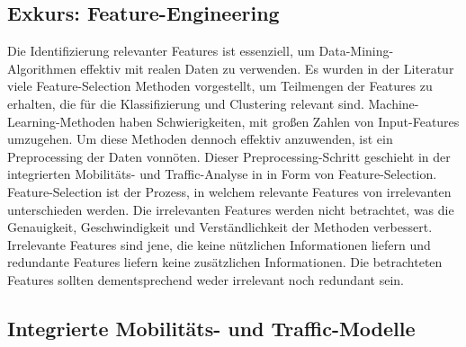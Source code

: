 \documentclass[12pt, a4paper]{article}
\begin{document}
\subsection{Exkurs: Feature-Engineering}
Die Identifizierung relevanter Features ist essenziell, um Data-Mining-Algorithmen effektiv mit realen Daten zu verwenden.
Es wurden in der Literatur viele Feature-Selection Methoden vorgestellt, um Teilmengen der Features zu erhalten,
die für die Klassifizierung und Clustering relevant sind.
Machine-Learning-Methoden haben Schwierigkeiten, mit großen Zahlen von Input-Features
umzugehen. Um diese Methoden dennoch effektiv anzuwenden, ist ein Preprocessing der Daten vonnöten. \cite{Kumar2014}
Dieser Preprocessing-Schritt geschieht in der integrierten Mobilitäts- und Traffic-Analyse in \cite{Alipour2018} in
Form von Feature-Selection. Feature-Selection ist der Prozess, in welchem relevante Features von irrelevanten unterschieden
werden. Die irrelevanten Features werden nicht betrachtet, was die Genauigkeit, Geschwindigkeit und Verständlichkeit 
der Methoden verbessert. Irrelevante Features sind jene, die keine nützlichen Informationen liefern und redundante Features
liefern keine zusätzlichen Informationen. \cite{Kumar2014} Die betrachteten Features sollten dementsprechend weder
irrelevant noch redundant sein.

\subsection{Integrierte Mobilitäts- und Traffic-Modelle}
\label{sec:phase3}
\end{document}
